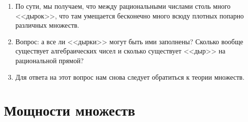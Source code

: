 \begin{enumerate}
\item По сути, мы получаем, что между рациональными числами столь много <<дырок>>, что там умещается бесконечно много всюду плотных попарно различных множеств.
\item Вопрос: а все ли <<дырки>> могут быть ими заполнены? Сколько вообще существует алгебраических чисел и сколько существует <<дыр>> на рациональной прямой?
\item Для ответа на этот вопрос нам снова следует обратиться к теории множеств.
\end{enumerate}










\section{Мощности множеств}\label{powers}



